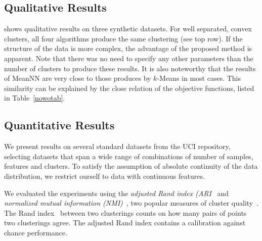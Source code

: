 
\subsection{Qualitative Results}
 shows qualitative results on three synthetic datasets.
For well separated, convex clusters, all four algorithms produce the same
clustering (see top row).  If the structure of the data is more complex, the
advantage of the proposed method is apparent.  Note that there was no need to
specify any other parameters than the number of clusters to produce these
results.  It is also noteworthy that the results of MeanNN are very close to
those produces by $k$-Means in most cases. This similarity can be explained
by the close relation of the objective functions, listed in Table~\ref{nowotab}.

\subsection{Quantitative Results}
We present results on several standard datasets from the UCI repository, 
selecting datasets that span a wide range of combinations of number
of samples, features and clusters.
To satisfy the assumption of absolute continuity of the data distribution, 
we restrict ourself to data with continuous features.

We evaluated the experiments using the \emph{adjusted Rand index 
(ARI}~\citep{hubert1985comparing} and \emph{normalized mutual
information (NMI)}~\citep{strehl2003cluster}, two popular measures 
of cluster quality~\citep{gomes2010discriminative,kamvar2003spectral}.
The Rand index~\citep{rand1971objective} between two clusterings counts on how
many pairs of points two clusterings agree. The adjusted Rand index contains a
calibration against chance performance.

